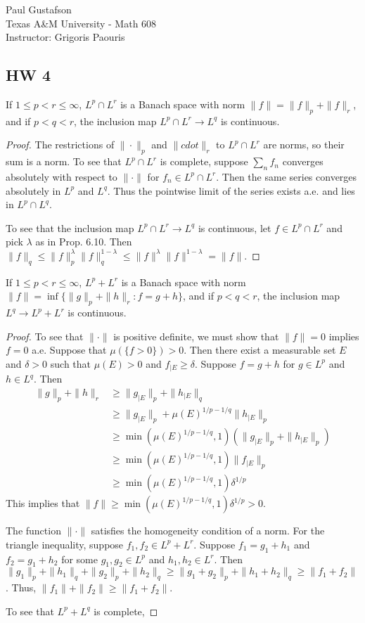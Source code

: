 \documentclass{article}
\begin{document}
\noindent Paul Gustafson\\
\noindent Texas A\&M University - Math 608 \\ 
\noindent Instructor: Grigoris Paouris

\subsection*{HW 4}
 If $1 \le p < r \le \infty$, $L^p \cap L^r$ is a Banach space with norm $\|f\| = \|f\|_p + \|f\|_r$, and if 
$p < q< r$, the inclusion map $L^p \cap L^r \to L^q$ is continuous.
\begin{proof}
The restrictions of $\|\cdot\|_p$ and $\|cdot\|_r$ to $L^p \cap L^r$ are norms, so their sum is a norm.  To see that $L^p \cap L^r$ is complete, suppose $\sum_n f_n$ converges absolutely with respect to $\| \cdot \|$ for $f_n \in L^p \cap L^r$.  Then the same series converges absolutely in $L^p$ and $L^q$.  Thus the pointwise limit of the series exists a.e. and lies in $L^p \cap L^q$.

To see that the inclusion map $L^p \cap L^r \to L^q$ is continuous, let $f \in L^p \cap L^r$ and pick $\lambda$ as in Prop. 6.10.  Then $\|f\|_q \le \|f\|_p^\lambda \|f\|_q^{1 - \lambda} \le \|f\|^\lambda \|f\|^{1 - \lambda} = \|f\|$.
\end{proof}

 If $1 \le p < r \le \infty$, $L^p + L^r$ is a Banach space with norm $\|f\| = \inf\{\|g\|_p + \|h\|_r : f = g + h\}$, and if
$p < q < r$, the inclusion map $L^q \to L^p + L^r$ is continuous.

\begin{proof}
To see that $\|\cdot\|$ is positive definite, we must show that $\|f\| = 0$ implies $f = 0$ a.e.  Suppose that $\mu(\{f > 0\}) > 0$.  Then there exist a measurable set $E$ and $\delta > 0$ such that $\mu(E) > 0$ and $f_{|E} \ge \delta$. Suppose $f = g + h$ for $g \in L^p$ and $h \in L^q$.  Then 
\begin{align*}
\|g\|_p + \|h\|_r &  \ge \|g_{|E}\|_p + \|h_{|E}\|_q 
\\ &  \ge \|g_{|E}\|_p + \mu(E)^{1/p - 1/q}\|h_{|E}\|_p
\\ & \ge \min(\mu(E)^{1/p - 1/q},1) (\|g_{|E}\|_p + \|h_{|E}\|_p)
\\ & \ge \min(\mu(E)^{1/p - 1/q},1) \|f_{|E}\|_p
\\  & \ge \min(\mu(E)^{1/p - 1/q},1) \delta^{1/p}
\end{align*}
This implies that $\|f\| \ge \min(\mu(E)^{1/p - 1/q},1) \delta^{1/p} > 0$.

The function $\|\cdot\|$ satisfies the homogeneity condition of a norm.  For the triangle inequality, suppose $f_1, f_2 \in L^p + L^r$.  Suppose $f_1 = g_1 + h_1$ and $f_2 = g_1 + h_2$ for some $g_1,g_2 \in L^p$ and $h_1, h_2 \in L^r$. Then $\|g_1\|_p + \|h_1\|_q +  \|g_2\|_p + \|h_2\|_q \ge \|g_1 + g_2\|_p + \|h_1 + h_2\|_q \ge \|f_1 +f_2\|$.  Thus, $\|f_1\| + \|f_2\| \ge \|f_1 + f_2\|$.

To see that $L^p + L^q$ is complete,


\end{proof}
\end{document}
